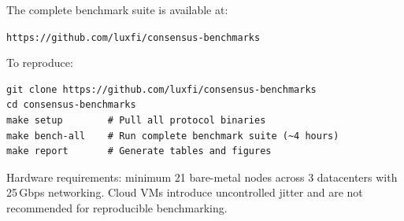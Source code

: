 \documentclass[11pt]{article}
\begin{document}
The complete benchmark suite is available at:
\begin{center}
\texttt{https://github.com/luxfi/consensus-benchmarks}
\end{center}

\noindent To reproduce:
\begin{verbatim}
git clone https://github.com/luxfi/consensus-benchmarks
cd consensus-benchmarks
make setup        # Pull all protocol binaries
make bench-all    # Run complete benchmark suite (~4 hours)
make report       # Generate tables and figures
\end{verbatim}

\noindent Hardware requirements: minimum 21 bare-metal nodes across 3 datacenters with
25\,Gbps networking. Cloud VMs introduce uncontrolled jitter and are not recommended for
reproducible benchmarking.
\end{document}
